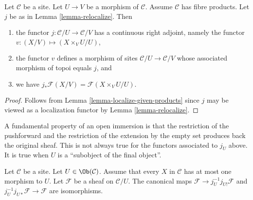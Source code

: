 \begin{lemma}
\label{lemma-relocalize-given-fibre-products}
Let $\mathcal{C}$ be a site. Let $U \to V$ be a morphism of $\mathcal{C}$.
Assume $\mathcal{C}$ has fibre products. Let $j$ be as in
Lemma \ref{lemma-relocalize}. Then
\begin{enumerate}
\item the functor $j : \mathcal{C}/U \to \mathcal{C}/V$
has a continuous right adjoint, namely the functor
$v : (X/V) \mapsto (X \times_V U/U)$,
\item the functor $v$ defines a morphism of sites
$\mathcal{C}/U \to \mathcal{C}/V$ whose associated morphism of topoi equals
$j$, and
\item we have $j_*\mathcal{F}(X/V) = \mathcal{F}(X \times_V U/U)$.
\end{enumerate}
\end{lemma}

\begin{proof}
Follows from Lemma \ref{lemma-localize-given-products} since $j$ may be viewed
as a localization functor by Lemma \ref{lemma-relocalize}.
\end{proof}

\noindent
A fundamental property of an open immersion is
that the restriction of the pushforward and the restriction
of the extension by the empty set produces back the original sheaf.
This is not always true for the functors associated to $j_U$
above. It is true when $U$ is a ``subobject of the final object''.

\begin{lemma}
\label{lemma-restrict-back}
Let $\mathcal{C}$ be a site.
Let $U \in \Ob(\mathcal{C})$.
Assume that every $X$ in $\mathcal{C}$ has at most
one morphism to $U$. Let $\mathcal{F}$ be a sheaf on $\mathcal{C}/U$.
The canonical maps $\mathcal{F} \to j_U^{-1}j_{U!}\mathcal{F}$
and $j_U^{-1}j_{U*}\mathcal{F} \to \mathcal{F}$ are
isomorphisms.
\end{lemma}

